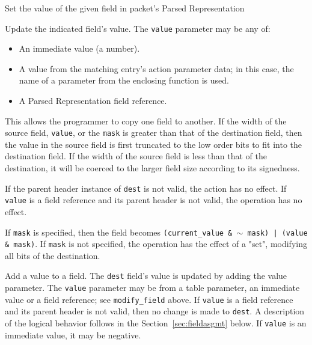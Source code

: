 \documentclass[12pt]{article}
\begin{document}
{ %
Set the value of the given field in packet's Parsed Representation
}
{ %
}
{ %
Update the indicated field's value. The \texttt{value} parameter may be any of:

\begin{itemize}
\item
An immediate value (a number).
\item
A value from the matching entry's action parameter data; in this case, the 
name of a parameter from the enclosing function is used.
\item
A Parsed Representation field reference.
\end{itemize}


This allows the programmer to copy one field to another. If the width of 
the source field, \texttt{value}, or the \texttt{mask} is greater than that of the destination 
field, then the value in the source field is first truncated to the low order 
bits to fit into the destination field. If the width of the source field 
is less than that of the destination, it will be coerced to the larger field 
size according to its signedness.

If the parent header instance of \texttt{dest} is not valid, the action has no effect. 
If \texttt{value} is a field reference and its parent header is not valid, the operation 
has no effect.

If \texttt{mask} is specified, then the field becomes \texttt{(current_value \& $\sim$ mask) | 
(value \& mask)}.  If \texttt{mask} is not specified, the operation has the effect 
of a "set", modifying all bits of the destination. 

}


{ %
Add a value to a field.
}
{ %
}
{ %
The \texttt{dest} field's value is updated by adding the value parameter. The \texttt{value} parameter 
may be from a table parameter, an immediate value {\color{red}or a field reference}; see \texttt{modify_field} above.  If \texttt{value} is a field reference 
and its parent header is not valid, then no change is made to \texttt{dest}. A description 
of the logical behavior follows in the Section~\ref{sec:fieldasgmt} below.
If \texttt{value} is an immediate value, it may 
be negative.
}
\end{document}
